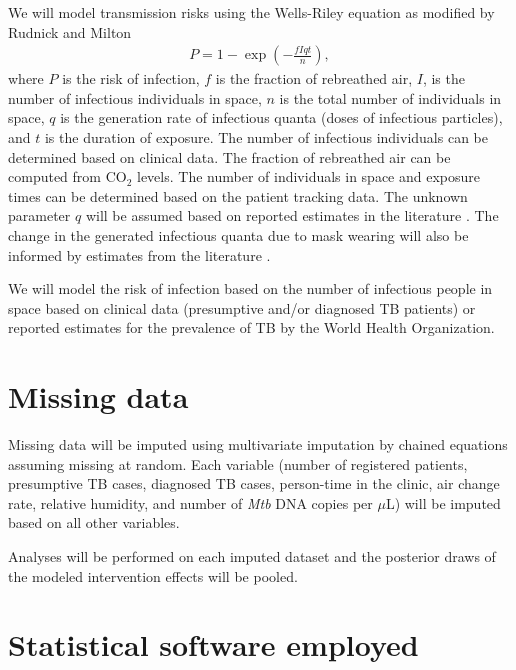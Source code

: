 \documentclass{article}
\begin{document}
We will model transmission risks using the Wells-Riley equation\cite{Riley1962ARRD} as modified by Rudnick and Milton\cite{Rudnick2003IndoorAir} 
\begin{align*}
    P = 1 - \exp\left(-\frac{fIqt}{n}\right),
\end{align*}
where $P$ is the risk of infection, $f$ is the fraction of rebreathed air, $I$, is the number of infectious individuals in space, $n$ is the total number of individuals in space, $q$ is the generation rate of infectious quanta (doses of infectious particles), and $t$ is the duration of exposure. The number of infectious individuals can be determined based on clinical data. The fraction of rebreathed air can be computed from CO$_2$ levels. The number of individuals in space and exposure times can be determined based on the patient tracking data. The unknown parameter $q$ will be assumed based on reported estimates in the literature \cite{Mikszewski2021GF,Banholzer2024PGPH,Andrews2014JID,Escombe2008PLoSMed,Nardell1991ARRD,Riley1962ARRD}. The change in the generated infectious quanta due to mask wearing will also be informed by estimates from the literature \cite{McCreesh2021BMJGlobalHealth,Dharmadhikari2012AJRCCM}. 

We will model the risk of infection based on the number of infectious people in space based on clinical data (presumptive and/or diagnosed TB patients) or reported estimates for the prevalence of TB by the World Health Organization\cite{WHO2022TBReport}. 


\section{Missing data}

Missing data will be imputed using multivariate imputation by chained equations assuming missing at random. Each variable (number of registered patients, presumptive TB cases, diagnosed TB cases, person-time in the clinic, air change rate, relative humidity, and number of \emph{Mtb} DNA copies per $\mu$L) will be imputed based on all other variables. 

Analyses will be performed on each imputed dataset and the posterior draws of the modeled intervention effects will be pooled.   

\section{Statistical software employed}
\end{document}
